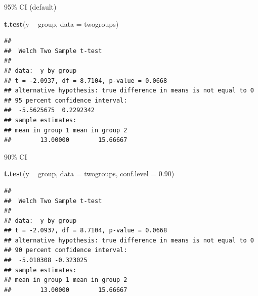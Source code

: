 \documentclass[ignorenonframetext,]{beamer}
\newenvironment{Shaded}{\begin{snugshade}}{\end{snugshade}}
\newcommand{\DataTypeTok}[1]{\textcolor[rgb]{0.13,0.29,0.53}{#1}}
\newcommand{\FloatTok}[1]{\textcolor[rgb]{0.00,0.00,0.81}{#1}}
\newcommand{\KeywordTok}[1]{\textcolor[rgb]{0.13,0.29,0.53}{\textbf{#1}}}
\newcommand{\NormalTok}[1]{#1}
\newcommand{\OperatorTok}[1]{\textcolor[rgb]{0.81,0.36,0.00}{\textbf{#1}}}
\newcommand{\StringTok}[1]{\textcolor[rgb]{0.31,0.60,0.02}{#1}}
\begin{document}
\begin{frame}[fragile]{95\% CI (default)}
\protect\hypertarget{ci-default}{}

\begin{Shaded}
\begin{Highlighting}[]
\KeywordTok{t.test}\NormalTok{(y }\OperatorTok{~}\StringTok{ }\NormalTok{group, }\DataTypeTok{data =}\NormalTok{ twogroups)}
\end{Highlighting}
\end{Shaded}

\begin{verbatim}
## 
##  Welch Two Sample t-test
## 
## data:  y by group
## t = -2.0937, df = 8.7104, p-value = 0.0668
## alternative hypothesis: true difference in means is not equal to 0
## 95 percent confidence interval:
##  -5.5625675  0.2292342
## sample estimates:
## mean in group 1 mean in group 2 
##        13.00000        15.66667
\end{verbatim}

\end{frame}

\begin{frame}[fragile]{90\% CI}
\protect\hypertarget{ci}{}

\begin{Shaded}
\begin{Highlighting}[]
\KeywordTok{t.test}\NormalTok{(y }\OperatorTok{~}\StringTok{ }\NormalTok{group, }\DataTypeTok{data =}\NormalTok{ twogroups, }\DataTypeTok{conf.level =} \FloatTok{0.90}\NormalTok{)}
\end{Highlighting}
\end{Shaded}

\begin{verbatim}
## 
##  Welch Two Sample t-test
## 
## data:  y by group
## t = -2.0937, df = 8.7104, p-value = 0.0668
## alternative hypothesis: true difference in means is not equal to 0
## 90 percent confidence interval:
##  -5.010308 -0.323025
## sample estimates:
## mean in group 1 mean in group 2 
##        13.00000        15.66667
\end{verbatim}

\end{frame}
\end{document}
